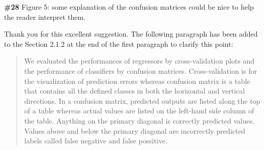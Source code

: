 \documentclass{ar2rc}
\begin{document}

    \Comment \textbf{\#28} Figure 5: some explanation of the confusion matrices could be nice to help the reader interpret them.

    \Response Thank you for this excellent suggestion. The following paragraph has been added to the Section 2.1.2 at the end of the first paragraph to clarify this point:\\

    \begin{quote}
        We evaluated the performances of regressors by cross-validation plots and   the performance of classifiers by confusion matrices. Cross-validation is for the visualization of prediction errors whereas confusion matrix is a table that contains all the defined classes in both the horizontal and vertical directions. In a confusion matrix, predicted outputs are listed along the top of a table whereas actual values are listed on the left-hand side column of the table. Anything on the primary diagonal is correctly predicted values. Values above and below the primary diagonal are incorrectly predicted labels called false negative and false possitive.
    \end{quote}



\end{document}

